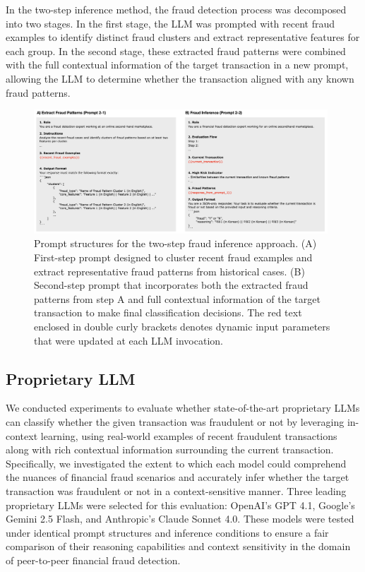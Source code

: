 \documentclass[sigconf]{acmart}
\begin{document}
In the two-step inference method, the fraud detection process was decomposed into two stages. In the first stage, the LLM was prompted with recent fraud examples to identify distinct fraud clusters and extract representative features for each group. In the second stage, these extracted fraud patterns were combined with the full contextual information of the target transaction in a new prompt, allowing the LLM to determine whether the transaction aligned with any known fraud patterns.


\begin{figure}[t!]
  \centering
  \includegraphics[width=0.98\textwidth]{./figures/fig_prompt_2step.png}
  \caption{Prompt structures for the two-step fraud inference approach. (A) First-step prompt designed to cluster recent fraud examples and extract representative fraud patterns from historical cases. (B) Second-step prompt that incorporates both the extracted fraud patterns from step A and full contextual information of the target transaction to make final classification decisions. The red text enclosed in double curly brackets denotes dynamic input parameters that were updated at each LLM invocation.}
  \label{fig_prompt_2step}
\end{figure}


\subsection{Proprietary LLM}\label{proprietary_llm}
We conducted experiments to evaluate whether state-of-the-art proprietary LLMs can classify whether the given transaction was fraudulent or not by leveraging in-context learning, using real-world examples of recent fraudulent transactions along with rich contextual information surrounding the current transaction. Specifically, we investigated the extent to which each model could comprehend the nuances of financial fraud scenarios and accurately infer whether the target transaction was fraudulent or not in a context-sensitive manner.
Three leading proprietary LLMs were selected for this evaluation: OpenAI's GPT 4.1, Google's Gemini 2.5 Flash, and Anthropic's Claude Sonnet 4.0. These models were tested under identical prompt structures and inference conditions to ensure a fair comparison of their reasoning capabilities and context sensitivity in the domain of peer-to-peer financial fraud detection.
\end{document}
